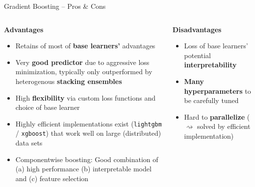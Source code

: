 \documentclass[11pt,compress,t,notes=noshow, xcolor=table]{beamer}
\newcommand{\highlight}[1]{\textcolor{hlcol}{\textbf{#1}}}
\newcommand{\positem}{\item[\textcolor{hlcol}{$\bm{+}$}]}
\newcommand{\negitem}{\item[\textcolor{hlcol}{$\bm{-}$}]}
\begin{document}
\begin{frame2}{Gradient Boosting -- Pros \& Cons}
  \footnotesize

\begin{columns}[onlytextwidth]
  \begin{column}{0.5\textwidth}
    \highlight{Advantages}
    \footnotesize
    \begin{itemize}
      \positem Retains of most of \textbf{base learners'} advantages 
      \positem Very \textbf{good predictor} due to aggressive loss minimization, typically only outperformed by heterogenous \textbf{stacking ensembles}
      \positem High \textbf{flexibility} via custom loss functions and choice of base learner
      \positem Highly efficient implementations exist (\texttt{lightgbm} / \texttt{xgboost}) that work well on large (distributed) data sets
      \positem Componentwise boosting: Good combination of (a) high performance (b) interpretable model and (c) feature selection
    \end{itemize}
  \end{column}
  \begin{column}{0.5\textwidth}
    \highlight{Disadvantages}
    \footnotesize
    \begin{itemize}
      \negitem Loss of base learners' potential \textbf{interpretability}
      \negitem \textbf{Many hyperparameters} 
      to be carefully tuned
      \negitem Hard to \textbf{parallelize} ($\rightsquigarrow$ solved by efficient implementation)
    \end{itemize}
  \end{column}
\end{columns}

\end{frame2}
\end{document}
